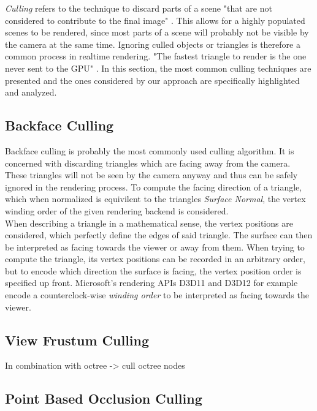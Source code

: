 \emph{Culling} refers to the technique to discard parts of a scene "that are not considered to contribute to the final 
image" \cite{AkenineMöller2018}. This allows for a highly populated scenes to be rendered, since most parts of a scene 
will probably not be visible by the camera at the same time. Ignoring culled objects or triangles is therefore a common 
process in realtime rendering. "The fastest triangle to render is the one never sent to the \ac{GPU}" \cite{AkenineMöller2018}.
In this section, the most common culling techniques are presented and the ones considered by our approach are specifically 
highlighted and analyzed. 


\subsection{Backface Culling} \label{subsec-backface-culling}

Backface culling is probably the most commonly used culling algorithm. It is concerned with discarding triangles which are 
facing away from the camera. These triangles will not be seen by the camera anyway and thus can be safely ignored in the 
rendering process. To compute the facing direction of a triangle, which when normalized is equivilent to the triangles 
\emph{Surface Normal}, the vertex winding order of the given rendering backend is considered.\\

When describing a triangle in a mathematical sense, the vertex positions are considered, which perfectly define the edges of 
said triangle. The surface can then be interpreted as facing towards the viewer or away from them. 
When trying to compute the triangle, its vertex positions can be recorded in an arbitrary order, but to encode which direction 
the surface is facing, the vertex position order is specified up front. Microsoft's rendering \ac{API}s D3D11 and D3D12 for 
example encode a counterclock-wise \emph{winding order} to be interpreted as facing towards the viewer. 

\subsection{View Frustum Culling} \label{subsec-view-frustum-culling}

In combination with octree -> cull octree nodes 

\subsection{Point Based Occlusion Culling} \label{subsec-point-based-occlusion-culling}

